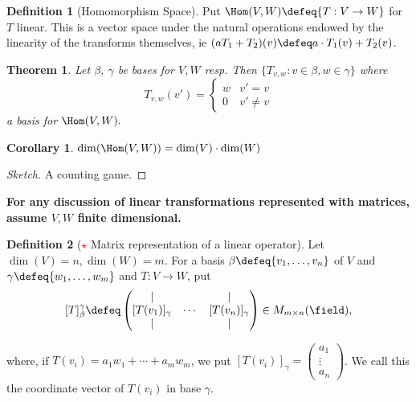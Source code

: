 \documentclass[12pt, oneside]{article}
\theoremstyle{definition}
\newtheorem{defn}{Definition}
\theoremstyle{plain}
\newtheorem{thm}{Theorem}
\newtheorem{cor}{Corollary}
\theoremstyle{remark}
\begin{document}
\begin{defn}[Homomorphism Space]
  Put $\Hom(V, W) \defeq \{T : V \to W\}$ for $T$ linear. This is a vector space under the natural operations endowed by the linearity of the transforms themselves, ie $(aT_1 + T_2)(v) \defeq a \cdot T_1(v) + T_2(v)$.
\end{defn}

\begin{thm}
  Let $\beta$, $\gamma$ be bases for $V, W$ resp. Then $\{T_{v, w} : v \in \beta, w \in \gamma\}$ where $$T_{v, w}(v') = \begin{cases}
    w & v' = v\\
    0 & v' \neq v
  \end{cases}$$ a basis for $\Hom(V, W).$
\end{thm}

\begin{cor}\label{cor:dimhomhom}
  $\dim(\Hom(V, W)) = \dim(V)\cdot \dim(W)$
\end{cor}
\begin{proof}[Sketch]
  A counting game.
\end{proof}


\begin{center}\textbf{For any discussion of linear transformations represented with matrices, assume $V, W$ finite dimensional.}\end{center}

\begin{defn}[\textcolor{red}{$\star$} Matrix representation of a linear operator]
  Let $\dim(V) = n, \dim(W) = m$. For a basis $\beta \defeq \{v_1, \dots, v_n\}$ of $V$ and $\gamma \defeq \{w_1, \dots, w_m\}$ and $T : V \to W$, put \[
   [T]_\beta^\gamma \defeq  \begin{pmatrix}
    \vert & & \vert\\
    [T(v_1)]_\gamma & \cdots & [T(v_n)]_\gamma \\
    \vert & & \vert
   \end{pmatrix} \in M_{m \times n}(\field),
  \]

  where, if $T(v_i) = a_1 w_1 + \cdots + a_m w_m$, we put $[T(v_i)]_\gamma = \begin{pmatrix}
    a_1\\
    \vdots\\
    a_n
  \end{pmatrix}$. We call this the coordinate vector of $T(v_i)$ in base $\gamma$.
\end{defn}
\end{document}

